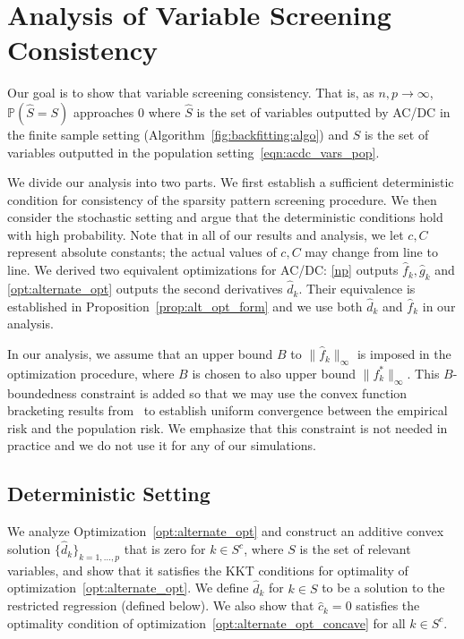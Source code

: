 \section{Analysis of Variable Screening Consistency}
\label{sec:finitesample}

Our goal is to show that variable screening consistency. That is, as $n,p \rightarrow \infty$, $\mathbb{P}( \hat{S} = S)$ approaches 0 where $\hat{S}$ is the set of variables outputted by AC/DC in the finite sample setting (Algorithm~\ref{fig:backfitting:algo}) and $S$ is the set of variables outputted in the population setting~\eqref{eqn:acdc_vars_pop}.

We divide our analysis into two parts. We first establish a sufficient
deterministic condition for consistency of the sparsity pattern
screening procedure.  We then consider the stochastic setting and argue that the 
deterministic conditions hold with high probability. Note that in all of our results 
and analysis, we let $c,
C$ represent absolute constants; the actual values of $c,C$ may change from line to line. We derived two equivalent optimizations for AC/DC: \eqref{np} outputs $\hat{f}_k, \hat{g}_k$ and \eqref{opt:alternate_opt} outputs the second derivatives $\hat{d}_k$. Their equivalence is established in Proposition~\ref{prop:alt_opt_form} and we use both $\hat{d}_k$ and $\hat{f}_k$ in our analysis.

In our analysis, we assume that an upper bound $B$ to $\| \hat{f}_k \|_\infty$ 
is imposed in the optimization procedure, where $B$ is chosen to also upper bound $\| f^*_k \|_\infty$. This $B$-boundedness constraint is added so that we may use the convex function bracketing results from~\cite{kim2014global} to establish uniform convergence between the empirical risk and the population risk. We emphasize that this constraint is not needed in practice and we do not use it for any of our simulations. 


\subsection{Deterministic Setting}

We analyze Optimization~\ref{opt:alternate_opt} and construct an additive convex solution $\{\hat{d}_k\}_{k=1,\ldots,p}$
that is zero for $k \in S^c$, where $S$ is the set of relevant
variables, and show that it satisfies the KKT
conditions for optimality of optimization~\eqref{opt:alternate_opt}. We
define $\hat{d}_k$ for $k \in S$ to be a solution to the restricted
regression (defined below). We also show that $\hat{c}_k =
0$ satisfies the optimality condition of
optimization~\eqref{opt:alternate_opt_concave} for all $k \in S^c$.

